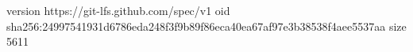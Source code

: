 version https://git-lfs.github.com/spec/v1
oid sha256:24997541931d6786eda248f3f9b89f86eca40ea67af97e3b38538f4aee5537aa
size 5611
